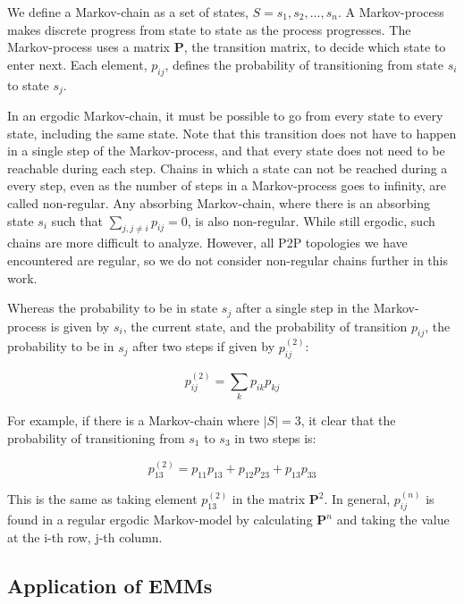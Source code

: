 \documentclass[a4paper,11pt,twocolumn]{article}
\begin{document}
We define a Markov-chain as a set of states, $S = {s_1, s_2, \ldots, s_n}$.  A
Markov-process makes discrete progress from state to state as the process
progresses.  The Markov-process uses a matrix $\textbf{P}$, the transition
matrix, to decide which state to enter next.  Each element, $p_{ij}$, defines
the probability of transitioning from state $s_i$ to state $s_j$.

In an ergodic Markov-chain, it must be possible to go from every state to every
state, including the same state.  Note that this transition does not have to
happen in a single step of the Markov-process, and that every state does not
need to be reachable during each step.  Chains in which a state can not be
reached during a every step, even as the number of steps in a Markov-process
goes to infinity, are called non-regular.  Any absorbing Markov-chain, where
there is an absorbing state $s_i$ such that $\sum_{j, j \ne i}{p_{ij}} = 0$, is
also non-regular.  While still ergodic, such chains are more difficult to
analyze.  However, all P2P topologies we have encountered are regular, so we do
not consider non-regular chains further in this work.

Whereas the probability to be in state $s_j$ after a single step in the
Markov-process is given by $s_i$, the current state, and the probability of
transition $p_{ij}$, the probability to be in $s_j$ after two steps if given by
$p_{ij}^{(2)}$:

\begin{equation}
	p_{ij}^{(2)} = \sum_{k}{p_{ik}p_{kj}}
\end{equation}

For example, if there is a Markov-chain where $|S| = 3$, it clear that
the probability of transitioning from $s_1$ to $s_3$ in two steps is:

\begin{equation}
	p_{13}^{(2)} = p_{11}p_{13} + p_{12}p_{23} + p_{13}p_{33}
\end{equation}

This is the same as taking element $p_{13}^{(2)}$ in the matrix
$\textbf{P}^2$.  In general, $p_{ij}^{(n)}$ is found in a regular ergodic
Markov-model by calculating $\textbf{P}^n$ and taking the value at the i-th
row, j-th column.

\subsection{Application of EMMs}
\label{sec:ergodic-application}
\end{document}
